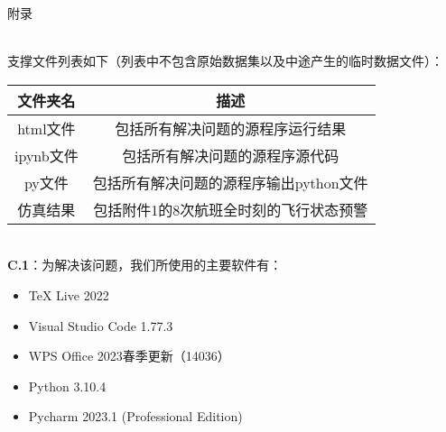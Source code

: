 \documentclass{MathModeling}
\begin{document}

	\begin{center}
		\heiti{} 附\hspace{2pc}录
	\end{center}

	
\newpage
	~\\

	支撑文件列表如下（列表中不包含原始数据集以及中途产生的临时数据文件）：

\begin{table}[H]
	\centering
	  \begin{tabular}{cc}
	  \toprule
	  \textbf{文件夹名} & \textbf{描述} \\
	  \midrule
	  html文件 & 包括所有解决问题的源程序运行结果 \\
	  ipynb文件 & 包括所有解决问题的源程序源代码 \\
	  py文件  & 包括所有解决问题的源程序输出python文件 \\
	  仿真结果  & 包括附件1的8次航班全时刻的飞行状态预警 \\
	  \bottomrule
	  \end{tabular}
\end{table}

	~\\

	\textbf{C.1}：为解决该问题，我们所使用的主要软件有：
	\begin{itemize}
		\item TeX Live 2022
		\item Visual Studio Code 1.77.3
		\item WPS Office 2023春季更新（14036）
		\item Python 3.10.4
		\item Pycharm 2023.1 (Professional Edition)
	\end{itemize}
\end{document}
